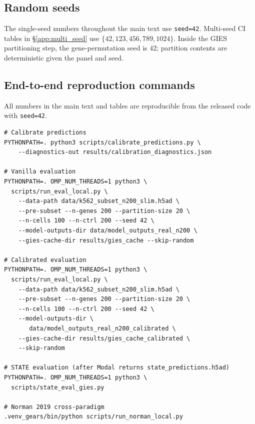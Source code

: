 \documentclass{article}
\theoremstyle{plain}
\theoremstyle{definition}
\theoremstyle{remark}
\begin{document}
\subsection{Random seeds}
\label{app:seeds}

The single-seed numbers throughout the main text use \texttt{seed=42}. Multi-seed CI tables in \S\ref{app:multi_seed} use $\{42, 123, 456, 789, 1024\}$. Inside the GIES partitioning step, the gene-permutation seed is $42$; partition contents are deterministic given the panel and seed.

\subsection{End-to-end reproduction commands}
\label{app:commands}

All numbers in the main text and tables are reproducible from the released code with \texttt{seed=42}.

\begin{verbatim}
# Calibrate predictions
PYTHONPATH=. python3 scripts/calibrate_predictions.py \
    --diagnostics-out results/calibration_diagnostics.json

# Vanilla evaluation
PYTHONPATH=. OMP_NUM_THREADS=1 python3 \
  scripts/run_eval_local.py \
    --data-path data/k562_subset_n200_slim.h5ad \
    --pre-subset --n-genes 200 --partition-size 20 \
    --n-cells 100 --n-ctrl 200 --seed 42 \
    --model-outputs-dir data/model_outputs_real_n200 \
    --gies-cache-dir results/gies_cache --skip-random

# Calibrated evaluation
PYTHONPATH=. OMP_NUM_THREADS=1 python3 \
  scripts/run_eval_local.py \
    --data-path data/k562_subset_n200_slim.h5ad \
    --pre-subset --n-genes 200 --partition-size 20 \
    --n-cells 100 --n-ctrl 200 --seed 42 \
    --model-outputs-dir \
       data/model_outputs_real_n200_calibrated \
    --gies-cache-dir results/gies_cache_calibrated \
    --skip-random

# STATE evaluation (after Modal returns state_predictions.h5ad)
PYTHONPATH=. OMP_NUM_THREADS=1 python3 \
  scripts/state_eval_gies.py

# Norman 2019 cross-paradigm
.venv_gears/bin/python scripts/run_norman_local.py
\end{verbatim}
\end{document}
